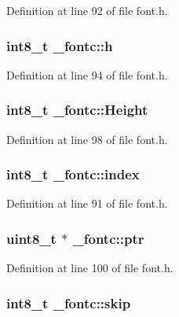 Definition at line 92 of file font.\-h.

\hypertarget{struct__fontc_a9feb8c838dfc1d4eebb15c8e53981944}{
\subsubsection[{h}]{\setlength{\rightskip}{0pt plus 5cm}int8\-\_\-t \-\_\-fontc\-::h}}\label{struct__fontc_a9feb8c838dfc1d4eebb15c8e53981944}


Definition at line 94 of file font.\-h.

\hypertarget{struct__fontc_a98f97c237dfb1027c38813a17ef6dcd6}{
\subsubsection[{Height}]{\setlength{\rightskip}{0pt plus 5cm}int8\-\_\-t \-\_\-fontc\-::\-Height}}\label{struct__fontc_a98f97c237dfb1027c38813a17ef6dcd6}


Definition at line 98 of file font.\-h.

\hypertarget{struct__fontc_a7cc0370744ff7ea964054d36917c9a2f}{
\subsubsection[{index}]{\setlength{\rightskip}{0pt plus 5cm}int8\-\_\-t \-\_\-fontc\-::index}}\label{struct__fontc_a7cc0370744ff7ea964054d36917c9a2f}


Definition at line 91 of file font.\-h.

\hypertarget{struct__fontc_a60a3fef5ccd80dff543aac3f22f74876}{
\subsubsection[{ptr}]{\setlength{\rightskip}{0pt plus 5cm}uint8\-\_\-t $\ast$ \-\_\-fontc\-::ptr}}\label{struct__fontc_a60a3fef5ccd80dff543aac3f22f74876}


Definition at line 100 of file font.\-h.

\hypertarget{struct__fontc_a44c94e91afa006cb2ffe55a99b3e2d3c}{
\subsubsection[{skip}]{\setlength{\rightskip}{0pt plus 5cm}int8\-\_\-t \-\_\-fontc\-::skip}}\label{struct__fontc_a44c94e91afa006cb2ffe55a99b3e2d3c}



